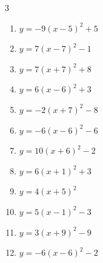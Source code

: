 \begin{multicols}{3}
\begin{enumerate}
  \item $\displaystyle y=-9\left( x-5\right)^{2}+5$

        \phantom{$\displaystyle 頂点\left( 5 , 5 \right)$}

  \item $\displaystyle y=7\left( x-7\right)^{2}-1$

        \phantom{$\displaystyle 頂点\left( 7 , -1 \right)$}

  \item $\displaystyle y=7\left( x+7\right)^{2}+8$

        \phantom{$\displaystyle 頂点\left( -7 , 8 \right)$}

  \item $\displaystyle y=6\left( x-6\right)^{2}+3$

        \phantom{$\displaystyle 頂点\left( 6 , 3 \right)$}

  \item $\displaystyle y=-2\left( x+7\right)^{2}-8$

        \phantom{$\displaystyle 頂点\left( -7 , -8 \right)$}

  \item $\displaystyle y=-6\left( x-6\right)^{2}-6$

        \phantom{$\displaystyle 頂点\left( 6 , -6 \right)$}

  \item $\displaystyle y=10\left( x+6\right)^{2}-2$

        \phantom{$\displaystyle 頂点\left( -6 , -2 \right)$}

  \item $\displaystyle y=6\left( x+1\right)^{2}+3$

        \phantom{$\displaystyle 頂点\left( -1 , 3 \right)$}

  \item $\displaystyle y=4\left( x+5\right)^{2}$

        \phantom{$\displaystyle 頂点\left( -5 , 0 \right)$}

  \item $\displaystyle y=5\left( x-1\right)^{2}-3$

        \phantom{$\displaystyle 頂点\left( 1 , -3 \right)$}

  \item $\displaystyle y=3\left( x+9\right)^{2}-9$

        \phantom{$\displaystyle 頂点\left( -9 , -9 \right)$}

  \item $\displaystyle y=-6\left( x-6\right)^{2}-2$


\end{enumerate}
\end{multicols}
